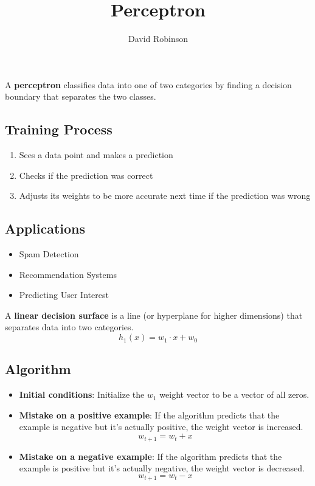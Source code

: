 \documentclass{article}
\title{Perceptron}
\author{David Robinson}
\date{}
\begin{document}
\maketitle

A \textbf{perceptron} classifies data into one of two categories by finding a decision boundary that separates the two classes.

\subsection*{Training Process}

\begin{enumerate}
    \item Sees a data point and makes a prediction
    \item Checks if the prediction was correct
    \item Adjusts its weights to be more accurate next time if the prediction was wrong
\end{enumerate}

\subsection*{Applications}
\begin{itemize}
    \item Spam Detection
    \item Recommendation Systems
    \item Predicting User Interest
\end{itemize}

A \textbf{linear decision surface} is a line (or hyperplane for higher dimensions) that separates data into two categories.
\[h_1(x)=w_1\cdot x + w_0\]

\subsection*{Algorithm}

\begin{itemize}
    \item \textbf{Initial conditions}: Initialize the $w_1$ weight vector to be a vector of all zeros.
    \item \textbf{Mistake on a positive example}: If the algorithm predicts that the example is negative but it's actually positive, the weight vector is increased.
    \[w_{t+1}=w_t + x\]
    \item \textbf{Mistake on a negative example}: If the algorithm predicts that the example is positive but it's actually negative, the weight vector is decreased.
    \[w_{t+1}=w_t - x\]
\end{itemize}
\end{document}
